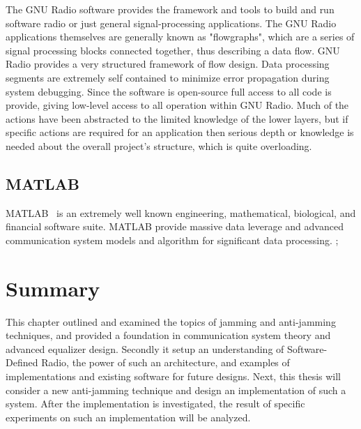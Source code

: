 The GNU Radio software provides the framework and tools to build and run software radio or just general signal-processing applications. The GNU Radio applications themselves are generally known as "flowgraphs", which are a series of signal processing blocks connected together, thus describing a data flow. GNU Radio provides a very structured framework of flow design. Data processing segments are extremely self contained to minimize error propagation during system debugging. Since the software is open-source full access to all code is provide, giving low-level access to all operation within GNU Radio. Much of the actions have been abstracted to the limited knowledge of the lower layers, but if specific actions are required for an application then serious depth or knowledge is needed about the overall project’s structure, which is quite overloading.

\subsection{MATLAB}
MATLAB~\cite{matlab} is an extremely well known engineering, mathematical, biological, and financial software suite. MATLAB provide massive data leverage and advanced communication
system models and algorithm for significant data processing. ;


\section{Summary}
This chapter outlined and examined the topics of jamming and anti-jamming techniques, and provided a foundation in communication system theory and advanced equalizer design.  Secondly it setup an understanding of Software-Defined Radio, the power of such an architecture, and examples of implementations and existing software for future designs.  Next, this thesis will consider a new anti-jamming technique and design an implementation of such a system.  After the implementation is investigated, the result of specific experiments on such an implementation will be analyzed.\\
